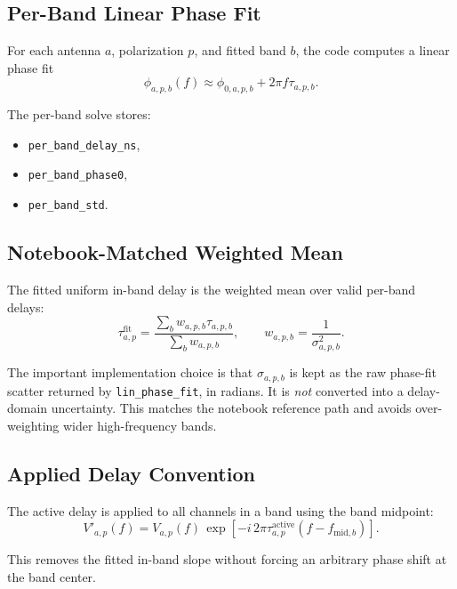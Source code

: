 \documentclass[11pt]{article}
\begin{document}
\subsection{Per-Band Linear Phase Fit}

For each antenna $a$, polarization $p$, and fitted band $b$, the code computes a
linear phase fit
\begin{equation}
  \phi_{a,p,b}(f) \approx \phi_{0,a,p,b} + 2\pi f \tau_{a,p,b}.
\end{equation}

The per-band solve stores:
\begin{itemize}[leftmargin=1.5em]
  \item \texttt{per\_band\_delay\_ns},
  \item \texttt{per\_band\_phase0},
  \item \texttt{per\_band\_std}.
\end{itemize}

\subsection{Notebook-Matched Weighted Mean}

The fitted uniform in-band delay is the weighted mean over valid per-band
delays:
\begin{equation}
  \tau^{\mathrm{fit}}_{a,p}
  =
  \frac{\sum_b w_{a,p,b}\tau_{a,p,b}}
       {\sum_b w_{a,p,b}},
  \qquad
  w_{a,p,b} = \frac{1}{\sigma_{a,p,b}^2}.
\end{equation}

The important implementation choice is that $\sigma_{a,p,b}$ is kept as the raw
phase-fit scatter returned by \texttt{lin\_phase\_fit}, in radians. It is
\emph{not} converted into a delay-domain uncertainty. This matches the notebook
reference path and avoids over-weighting wider high-frequency bands.

\subsection{Applied Delay Convention}

The active delay is applied to all channels in a band using the band midpoint:
\begin{equation}
  V'_{a,p}(f)
  =
  V_{a,p}(f)\,
  \exp\left[
    -i\,2\pi \tau^{\mathrm{active}}_{a,p}
    \left(f - f_{\mathrm{mid},b}\right)
  \right].
\end{equation}

This removes the fitted in-band slope without forcing an arbitrary phase shift
at the band center.
\end{document}
